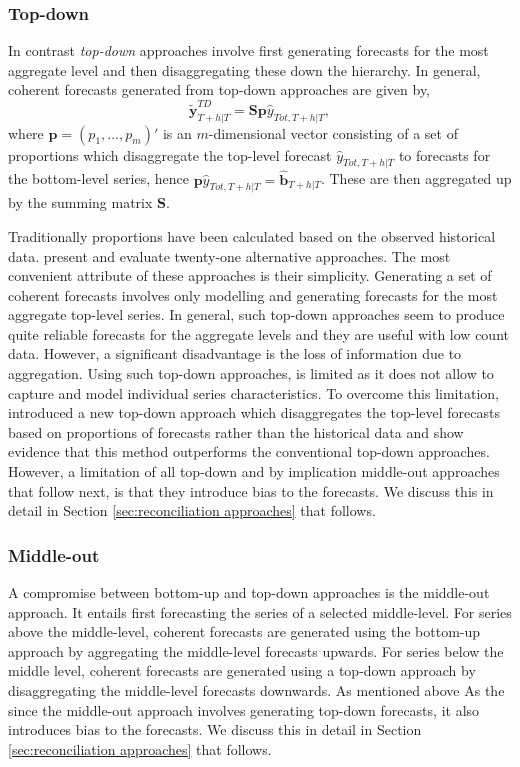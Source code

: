 \documentclass[graybox]{svmult}
\begin{document}
\subsubsection{Top-down}

In contrast \textit{top-down} approaches involve first generating forecasts for the most aggregate level and then disaggregating these down the hierarchy. In general, coherent forecasts generated from top-down approaches are given by,
\begin{equation*}
\tilde{\bm{y}}^{TD}_{T+h|T}=\bm{S}\bm{p}\hat{y}_{Tot, T+h|T},
\end{equation*}
where $\bm{p} = (p_1,...,p_m)'$ is an $m$-dimensional vector consisting of a set of proportions which disaggregate the top-level forecast $\hat{y}_{Tot, T+h|T}$ to forecasts for the bottom-level series, hence $\bm{p}\hat{y}_{Tot, T+h|T}=\bm{\hat{\bm{b}}}_{T+h|T}$. These are then aggregated up by the summing matrix $\bm{S}$.

Traditionally proportions have been calculated based on the observed historical data. \cite{gross1990} present and evaluate twenty-one alternative approaches. The most convenient attribute of these approaches is their simplicity. Generating a set of coherent forecasts involves only modelling and generating forecasts for the most aggregate top-level series. In general, such top-down approaches seem to produce quite reliable forecasts for the aggregate levels and they are useful with low count data. However, a significant disadvantage is the loss of information due to aggregation. Using such top-down approaches, is limited as it does not allow to capture and model individual series characteristics. To overcome this limitation, \cite{AthEtAl2009} introduced a new top-down approach which disaggregates the top-level forecasts based on proportions of forecasts rather than the historical data and show evidence that this method outperforms the conventional top-down approaches. However, a limitation of all top-down and by implication middle-out approaches that follow next, is that they introduce bias to the forecasts. We discuss this in detail in Section \ref{sec:reconciliation approaches} that follows.

\subsubsection{Middle-out}

A compromise between bottom-up and top-down approaches is the middle-out approach. It entails first forecasting the series of a selected middle-level. For series above the middle-level, coherent forecasts are generated using the bottom-up approach by aggregating the middle-level forecasts upwards. For series below the middle level, coherent forecasts are generated using a top-down approach by disaggregating the middle-level forecasts downwards. As mentioned above As the since the middle-out approach involves generating top-down forecasts, it also introduces bias to the forecasts. We discuss this in detail in Section \ref{sec:reconciliation approaches} that follows.
\end{document}
